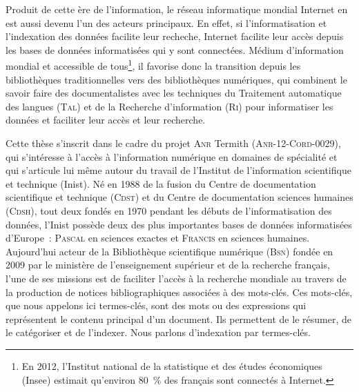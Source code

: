     Produit de cette ère de l'information, le réseau informatique mondial
    Internet en est aussi devenu l'un des acteurs principaux. En effet, si
    l'informatisation et l'indexation des données facilite leur recheche,
    Internet facilite leur accès depuis les bases de données informatisées qui y
    sont connectées. Médium d'information mondial et accessible de
    tous\footnote{En 2012, l'Institut national de la statistique et des études
    économiques (Insee) estimait qu'environ 80~\% des français sont connectés à
    Internet.}, il favorise donc la transition depuis les bibliothèques
    traditionnelles vers des bibliothèques numériques, qui combinent le savoir
    faire des documentalistes avec les techniques du Traitement automatique des
    langues (\textsc{Tal}) et de la Recherche d'information (\textsc{Ri}) pour
    informatiser les données et faciliter leur accès et leur recherche.

    Cette thèse s'inscrit dans le cadre du projet \textsc{Anr} Termith
    (\textsc{Anr-12-Cord-0029}), qui s'intéresse à l'accès à l'information
    numérique en domaines de spécialité et qui s'articule lui même autour du
    travail de l'Institut de l'information scientifique et technique (Inist). Né
    en 1988 de la fusion du Centre de documentation scientifique et technique
    (\textsc{Cdst}) et du Centre de documentation sciences humaines
    (\textsc{Cdsh}), tout deux fondés en 1970 pendant les débuts de
    l'informatisation des données, l'Inist possède deux des plus importantes
    bases de données informatisées d'Europe~: \textsc{Pascal} en sciences
    exactes et \textsc{Francis} en sciences humaines. Aujourd'hui acteur de la
    Bibliothèque scientifique numérique (\textsc{Bsn}) fondée en 2009 par le
    ministère de l'enseignement supérieur et de la recherche français, l'une de
    ses missions est de faciliter l'accès à la recherche mondiale au travers de
    la production de notices bibliographiques associées à des mots-clés. Ces
    mots-clés, que nous appelons ici termes-clés, sont des mots ou des
    expressions qui représentent le contenu principal d'un document. Ils
    permettent de le résumer, de le catégoriser et de l'indexer. Nous parlons
    d'indexation par termes-clés.
    

